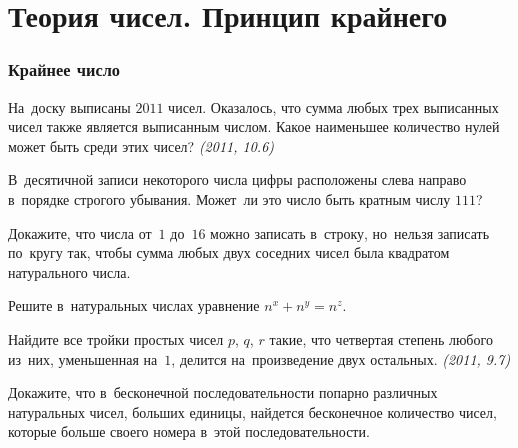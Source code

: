 
\section*{Теория чисел. Принцип крайнего}


\subsubsection*{Крайнее число}

\begin{problems}

\item
На~доску выписаны $2011$ чисел.
Оказалось, что сумма любых трех выписанных чисел также является выписанным
числом.
Какое наименьшее количество нулей может быть среди этих чисел?
\emph{(2011, 10.6)}

\item
В~десятичной записи некоторого числа цифры расположены слева направо в~порядке
строгого убывания.
Может~ли это число быть кратным числу $111$?

\item
Докажите, что числа от~$1$ до~$16$ можно записать в~строку, но~нельзя записать
по~кругу так, чтобы сумма любых двух соседних чисел была квадратом натурального
числа.



\item
Решите в~натуральных числах уравнение $n^{x} + n^{y} = n^{z}$.

\item
Найдите все тройки простых чисел $p$, $q$, $r$ такие, что четвертая степень
любого из~них, уменьшенная на~$1$, делится на~произведение двух остальных.
\emph{(2011, 9.7)}

\item
Докажите, что в~бесконечной последовательности попарно различных натуральных
чисел, больших единицы, найдется бесконечное количество чисел, которые больше
своего номера в~этой последовательности.

\end{problems}


